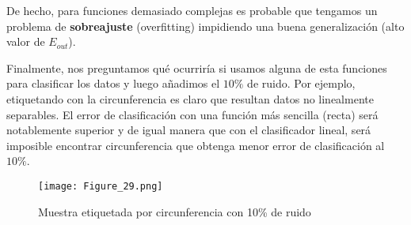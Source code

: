 De hecho, para funciones demasiado complejas es probable que tengamos
un problema de \textbf{sobreajuste} (overfitting) impidiendo una buena
generalización (alto valor de $E_{out}$).

Finalmente, nos preguntamos qué ocurriría si usamos alguna de esta funciones para
clasificar los datos y luego añadimos el $10\%$ de ruido. Por ejemplo, etiquetando
con la circunferencia es claro que resultan datos no linealmente separables. El error
de clasificación con una función más sencilla (recta) será notablemente superior y
de igual manera que con el clasificador lineal, será imposible encontrar circunferencia
que obtenga menor error de clasificación al $10\%$.

\begin{figure}[H]
\centering
\texttt{[image: Figure\_29.png]}
\caption{Muestra etiquetada por circunferencia con 10\% de ruido}
\end{figure}